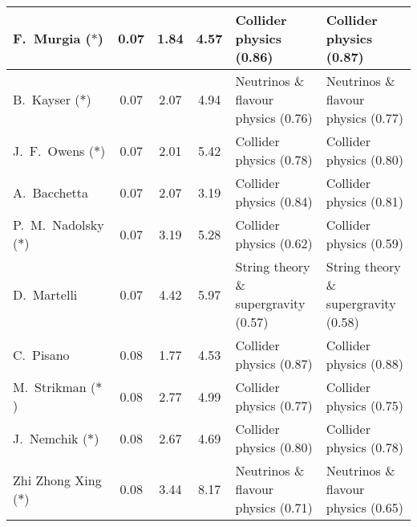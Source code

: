 \begin{table}[H]
\begin{tabular}{p{}|c|c|c|b{}|b{}}
     F.~Murgia ($\ast$) &  0.07 &          1.84 &          4.57 &              Collider physics (0.86) &              Collider physics (0.87)\\ \hline
     B.~Kayser ($\ast$) &  0.07 &          2.07 &          4.94 &  Neutrinos \& flavour physics (0.76) &  Neutrinos \& flavour physics (0.77)\\ \hline
   J.~F.~Owens ($\ast$) &  0.07 &          2.01 &          5.42 &              Collider physics (0.78) &              Collider physics (0.80)\\ \hline
           A.~Bacchetta &  0.07 &          2.07 &          3.19 &              Collider physics (0.84) &              Collider physics (0.81)\\ \hline
P.~M.~Nadolsky ($\ast$) &  0.07 &          3.19 &          5.28 &              Collider physics (0.62) &              Collider physics (0.59)\\ \hline
            D.~Martelli &  0.07 &          4.42 &          5.97 & String theory \& supergravity (0.57) & String theory \& supergravity (0.58)\\ \hline
              C.~Pisano &  0.08 &          1.77 &          4.53 &              Collider physics (0.87) &              Collider physics (0.88)\\ \hline
   M.~Strikman ($\ast$) &  0.08 &          2.77 &          4.99 &              Collider physics (0.77) &              Collider physics (0.75)\\ \hline
    J.~Nemchik ($\ast$) &  0.08 &          2.67 &          4.69 &              Collider physics (0.80) &              Collider physics (0.78)\\ \hline
Zhi Zhong Xing ($\ast$) &  0.08 &          3.44 &          8.17 &  Neutrinos \& flavour physics (0.71) &  Neutrinos \& flavour physics (0.65)\\ \hline
\bottomrule
\end{tabular}
\end{table}
